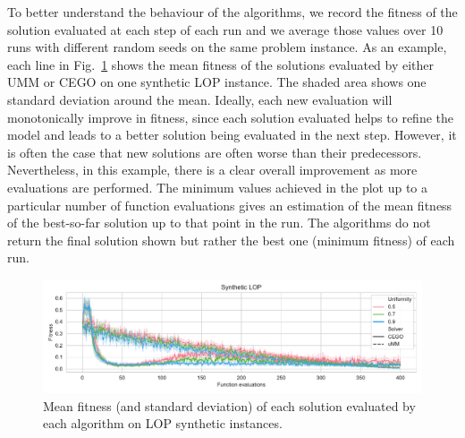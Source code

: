 \documentclass[runningheads]{llncs}
\begin{document}
To better understand the behaviour of the algorithms, we record the fitness of
the solution evaluated at each step of each run and we average those values
over 10 runs with different random seeds on the same problem instance.  As an example, each line in Fig.~\ref{fig:lop_synth} 
shows the mean fitness of the solutions evaluated by either UMM or CEGO on one synthetic LOP
instance. The shaded area shows one standard deviation around the
mean. Ideally, each new evaluation will monotonically improve in fitness, since each solution evaluated helps to refine the model and leads to a
better solution being evaluated in the next step.  However, it is often the case that  
new solutions
are often worse than their predecessors. Nevertheless, in this example, there
is a clear overall improvement as more evaluations are performed. The minimum
values achieved in the plot up to a particular number of function evaluations
gives an estimation of the mean fitness of the best-so-far solution up to that
point in the run. The algorithms do not return the final solution shown but
rather the best one (minimum fitness) of each run.


\begin{figure}[tb]
  \centering%
  \includegraphics[width=\textwidth]{img/synthetic_LOP_combined}
  \caption{Mean fitness  (and standard deviation)  of each solution evaluated by each algorithm on LOP synthetic instances.\label{fig:lop_synth}}
\end{figure}
\end{document}
